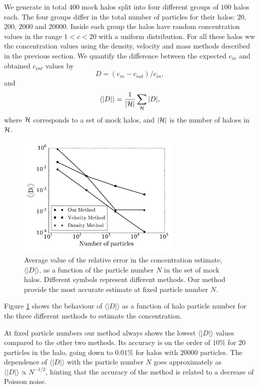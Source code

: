 \documentclass[a4,useAMS,usenatbib,usegraphicx]{mn2e}
\newcommand{\avg}[1]{\langle{#1}\rangle}
\begin{document}
We generate in total $400$ mock halos split into four different
groups of $100$ halos each.
The four groups differ in the total number of particles for their halos:
$20$, $200$, $2000$ and $20000$.
Inside each group the halos have random concentration values in
the range $1<c<20$ with a uniform distribution.
For all these halos ww the concentration values using the
density, velocity and mass methods described in the previous
section. 
We quantify the difference between the expected $c_{in}$
and obtained $c_{out}$ values by
%
\begin{equation}
D=(c_{in}-c_{out})/c_{in},
\label{eq:D}
\end{equation}
%
and
%
\begin{equation}
\avg{|D|}=\frac{1}{\left|{\cal{H}}\right|}\sum_{{\cal{H}}} |D|,
\end{equation}
%
where ${\cal{H}}$ corresponds to a set of mock halos, 
and $\left|{\cal{H}}\right|$ is the number of haloes in
${\cal{H}}$. 



\begin{figure}
\begin{center}
  \includegraphics[width=0.70\textwidth]{error.pdf}
\end{center}
\caption{Average value of the relative error in the concentration
  estimate, $\avg{|D|}$, as a function of the particle number $N$ in
  the set of mock halos. Different symbols represent different
  methods. Our method provide the most accurate estimate at fixed
  particle number $N$.
    \label{fig:error}}
\end{figure}

Figure \ref{fig:error} shows the behaviour of $\avg{|D|}$ as a function of
halo particle number for the three different methods to estimate the
concentration.

At fixed particle numbers our method always shows the lowest
$\avg{|D|}$ values compared to the other two methods.
Its accuracy is on the order of $10\%$ for $20$ particles in the halo,
going down to $0.01\%$ for halos with $20000$ particles.
The dependence of $\avg{|D|}$ with the particle number $N$ goes
approximately as $\avg{|D|}\propto N^{-1/2}$, hinting that
the accuracy of the method is related to a decrease of Poisson
noise.
\end{document}
